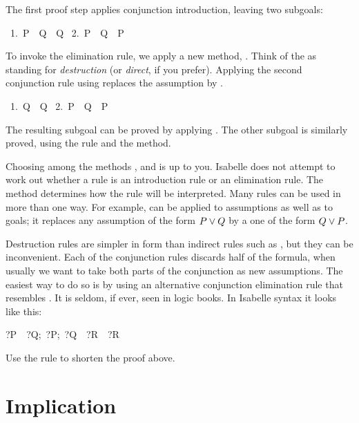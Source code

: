 The first proof step applies conjunction introduction, leaving 
two subgoals: 
\begin{isabelle}
\ 1.\ P\ \isasymand\ Q\ \isasymLongrightarrow\ Q\isanewline
\ 2.\ P\ \isasymand\ Q\ \isasymLongrightarrow\ P
\end{isabelle}

To invoke the elimination rule, we apply a new method, . 
Think of the  as standing for \emph{destruction} (or \emph{direct}, if
you prefer).   Applying the 
second conjunction rule using  replaces the assumption 
 by . 
\begin{isabelle}
\ 1.\ Q\ \isasymLongrightarrow\ Q\isanewline
\ 2.\ P\ \isasymand\ Q\ \isasymLongrightarrow\ P
\end{isabelle}
The resulting subgoal can be proved by applying .
The other subgoal is similarly proved, using the  rule and the 
 method.

Choosing among the methods ,  and  is up to 
you.  Isabelle does not attempt to work out whether a rule 
is an introduction rule or an elimination rule.  The 
method determines how the rule will be interpreted. Many rules 
can be used in more than one way.  For example,  can 
be applied to assumptions as well as to goals; it replaces any
assumption of the form
$P\vee Q$ by a one of the form $Q\vee P$.

Destruction rules are simpler in form than indirect rules such as ,
but they can be inconvenient.  Each of the conjunction rules discards half 
of the formula, when usually we want to take both parts of the conjunction as new
assumptions.  The easiest way to do so is by using an 
alternative conjunction elimination rule that resembles \@.  It is
seldom, if ever, seen in logic books.  In Isabelle syntax it looks like this: 
\begin{isabelle}
\isasymlbrakk?P\ \isasymand\ ?Q;\ \isasymlbrakk?P;\ ?Q\isasymrbrakk\ \isasymLongrightarrow\ ?R\isasymrbrakk\ \isasymLongrightarrow\ ?R
\end{isabelle}

\begin{exercise}
Use the rule  to shorten the proof above. 
\end{exercise}


\section{Implication}

